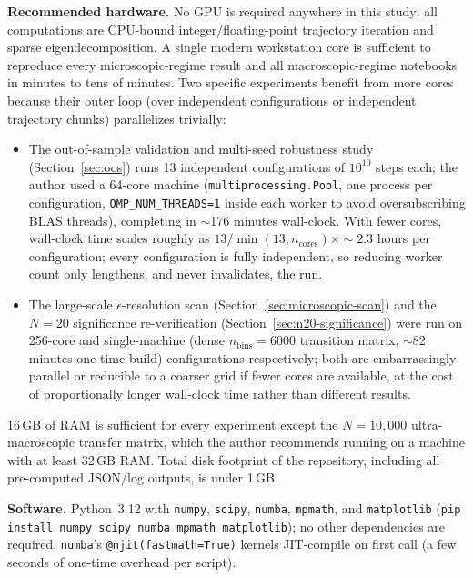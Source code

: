 \documentclass[mca,article,submit,oneauthor,pdftex]{Definitions/mdpi}
\begin{document}
\textbf{Recommended hardware.} No GPU is required anywhere in this study; all
computations are CPU-bound integer/floating-point trajectory iteration and
sparse eigendecomposition. A single modern workstation core is sufficient to
reproduce every microscopic-regime result and all macroscopic-regime
notebooks in minutes to tens of minutes. Two specific experiments benefit
from more cores because their outer loop (over independent configurations or
independent trajectory chunks) parallelizes trivially:
\begin{itemize}
\item The out-of-sample validation and multi-seed robustness study
(Section~\ref{sec:oos}) runs 13 independent configurations of
$10^{10}$ steps each; the author used a 64-core machine
(\texttt{multiprocessing.Pool}, one process per configuration,
\texttt{OMP\_NUM\_THREADS=1} inside each worker to avoid oversubscribing
BLAS threads), completing in $\sim$176 minutes wall-clock. With fewer
cores, wall-clock time scales roughly as
$13/\min(13,n_{\text{cores}})\times\sim2.3$ hours per configuration;
every configuration is fully independent, so reducing worker count only
lengthens, and never invalidates, the run.
\item The large-scale $\epsilon$-resolution scan
(Section~\ref{sec:microscopic-scan}) and the $N=20$ significance
re-verification (Section~\ref{sec:n20-significance}) were run on
256-core and single-machine (dense $n_{\text{bins}}=6000$ transition
matrix, $\sim$82 minutes one-time build) configurations respectively;
both are embarrassingly parallel or reducible to a coarser grid if fewer
cores are available, at the cost of proportionally longer wall-clock
time rather than different results.
\end{itemize}
16\,GB of RAM is sufficient for every experiment except the $N=10{,}000$
ultra-macroscopic transfer matrix, which the author recommends running on a machine
with at least 32\,GB RAM. Total disk footprint of the repository, including
all pre-computed JSON/log outputs, is under 1\,GB.

\textbf{Software.} Python~3.12 with \texttt{numpy}, \texttt{scipy},
\texttt{numba}, \texttt{mpmath}, and \texttt{matplotlib}
(\texttt{pip install numpy scipy numba mpmath matplotlib}); no other
dependencies are required. \texttt{numba}'s \texttt{@njit(fastmath=True)}
kernels JIT-compile on first call (a few seconds of one-time overhead per
script).
\end{document}
